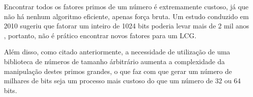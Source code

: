 \documentclass[12pt]{article}
\begin{document}
Encontrar todos os fatores primos de um número é extremamente custoso, já que
não há nenhum algoritmo eficiente, apenas força bruta. Um estudo conduzido em
2010 sugeriu que fatorar um inteiro de 1024 bits poderia levar mais de 2 mil
anos \cite{aoki:10}, portanto, não é prático encontrar novos fatores para um
LCG.

Além disso, como citado anteriormente, a necessidade de utilização de uma
biblioteca de números de tamanho árbitrário aumenta a complexidade da
manipulação destes primos grandes, o que faz com que gerar um número de
milhares de bits seja um processo mais custoso do que um número de 32 ou 64
bits.



\end{document}
